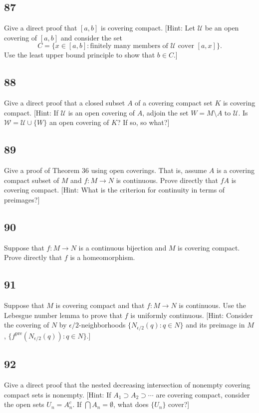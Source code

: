 \documentclass{amsart}
\begin{document}
\subsection*{87}
Give a direct proof that $[a,b]$ is covering compact. [Hint: Let $\mathcal{U}$ be an open covering of $[a,b]$ and consider the set
\[
C = \{x \in [a,b] : \text{finitely many members of } \mathcal{U} \text{ cover } [a,x]\}.
\]
Use the least upper bound principle to show that $b \in C$.]

\subsection*{88}
Give a direct proof that a closed subset $A$ of a covering compact set $K$ is covering compact. [Hint: If $\mathcal{U}$ is an open covering of $A$, adjoin the set $W = M \setminus A$ to $\mathcal{U}$. Is $\mathcal{W} = \mathcal{U} \cup \{W\}$ an open covering of $K$? If so, so what?]

\subsection*{89}
Give a proof of Theorem 36 using open coverings. That is, assume $A$ is a covering compact subset of $M$ and $f : M \to N$ is continuous. Prove directly that $fA$ is covering compact. [Hint: What is the criterion for continuity in terms of preimages?]

\subsection*{90}
Suppose that $f : M \to N$ is a continuous bijection and $M$ is covering compact. Prove directly that $f$ is a homeomorphism.

\subsection*{91}
Suppose that $M$ is covering compact and that $f : M \to N$ is continuous. Use the Lebesgue number lemma to prove that $f$ is uniformly continuous. [Hint: Consider the covering of $N$ by $\epsilon/2$-neighborhoods $\{N_{\epsilon/2}(q) : q \in N\}$ and its preimage in $M$, $\{f^{\mathrm{pre}}(N_{\epsilon/2}(q)) : q \in N\}$.]

\subsection*{92}
Give a direct proof that the nested decreasing intersection of nonempty covering compact sets is nonempty. [Hint: If $A_1 \supset A_2 \supset \cdots$ are covering compact, consider the open sets $U_n = A_n^c$. If $\bigcap A_n = \emptyset$, what does $\{U_n\}$ cover?]
\end{document}
